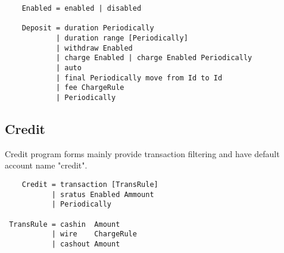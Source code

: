 \vspace{1\baselineskip}
\begin{lstlisting}
    Enabled = enabled | disabled

    Deposit = duration Periodically
            | duration range [Periodically]
            | withdraw Enabled
            | charge Enabled | charge Enabled Periodically
            | auto
            | final Periodically move from Id to Id
            | fee ChargeRule
            | Periodically
\end{lstlisting}
\vspace{1\baselineskip}

\subsection{Credit}

Credit program forms mainly provide transaction
filtering and have default account name "credit".

\vspace{1\baselineskip}
\begin{lstlisting}
    Credit = transaction [TransRule]
           | sratus Enabled Ammount
           | Periodically

 TransRule = cashin  Amount
           | wire    ChargeRule
           | cashout Amount

\end{lstlisting}
\vspace{1\baselineskip}
